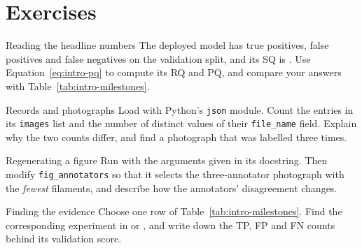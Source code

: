 \section*{Exercises}
\begin{exercise}{Reading the headline numbers}
The deployed model has \NumTP{} true positives, \NumFP{} false positives and \NumFN{} false
negatives on the validation split, and its SQ is \ValSQ{}. Use Equation~\eqref{eq:intro-pq} to
compute its RQ and PQ, and compare your answers with Table~\ref{tab:intro-milestones}.
\end{exercise}

\begin{exercise}{Records and photographs}
Load  with Python's \texttt{json}
module. Count the entries in its \texttt{images} list and the number of distinct values of their
\texttt{file\_name} field. Explain why the two counts differ, and find a photograph that was
labelled three times.
\end{exercise}

\begin{exercise}{Regenerating a figure}
Run  with the arguments given in its docstring. Then modify
\texttt{fig\_annotators} so that it selects the three-annotator photograph with the \emph{fewest}
filaments, and describe how the annotators' disagreement changes.
\end{exercise}

\begin{exercise}{Finding the evidence}
Choose one row of Table~\ref{tab:intro-milestones}. Find the corresponding experiment in
 or , and write down the TP,
FP and FN counts behind its validation score.
\end{exercise}
